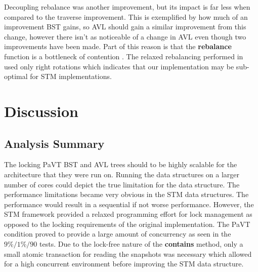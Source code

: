 \documentclass[conference]{IEEEtran}
\theoremstyle{definition}
\theoremstyle{theorem}
\begin{document}
Decoupling rebalance was another improvement, but its impact is far less when compared to the traverse improvement. This is exemplified by how much of an improvement BST gains, so AVL should gain a similar improvement from this change, however there isn't as noticeable of a change in AVL even though two improvements have been made. Part of this reason is that the \textbf{rebalance} function is a bottleneck of contention \cite{bron}. The relaxed rebalancing performed in \cite{bron} used only right rotations which indicates that our implementation may be sub-optimal for STM implementations.


\section{Discussion}
\subsection{Analysis Summary}
The locking PaVT BST and AVL trees should to be highly scalable for the architecture that they were run on. Running the data structures on a larger number of cores could depict the true limitation for the data structure. The performance limitations became very obvious in the STM data structures. The performance would result in a sequential if not worse performance. However, the STM framework provided a relaxed programming effort for lock management as opposed to the locking requirements of the original implementation. The PaVT condition proved to provide a large amount of concurrency as seen in the $9\%/1\%/90$ tests. Due to the lock-free nature of the \textbf{contains} method, only a small atomic transaction for reading the snapshots was necessary which allowed for a high concurrent environment before improving the STM data structure. 
\end{document}
